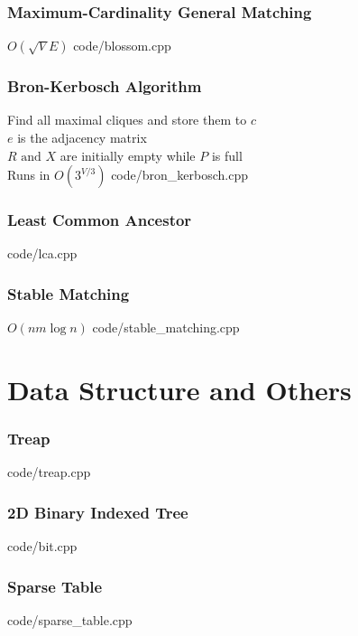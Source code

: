 \documentclass [landscape,8pt,a4paper,twocolumn]{article}
\begin{document}
\vfill\null

\section{Maximum-Cardinality General Matching}
$ O(\sqrt{V}E) $
 {code/blossom.cpp}

\section{Bron-Kerbosch Algorithm}
Find all maximal cliques and store them to $ c $ \\
$ e $ is the adjacency matrix \\
$ R \text{ and } X $ are initially empty while $ P $ is full \\
Runs in $ O(3^{V/3}) $
 {code/bron_kerbosch.cpp}

\vfill\null

\section{Least Common Ancestor}
 {code/lca.cpp}

\vfill\null

\section{Stable Matching}
$ O(nm\log{n}) $
 {code/stable_matching.cpp}

\vfill\null

\newpage
\part{Data Structure and Others}

\section{Treap}
 {code/treap.cpp}

\section{2D Binary Indexed Tree}
 {code/bit.cpp}

\section{Sparse Table}
 {code/sparse_table.cpp}
\end{document}
